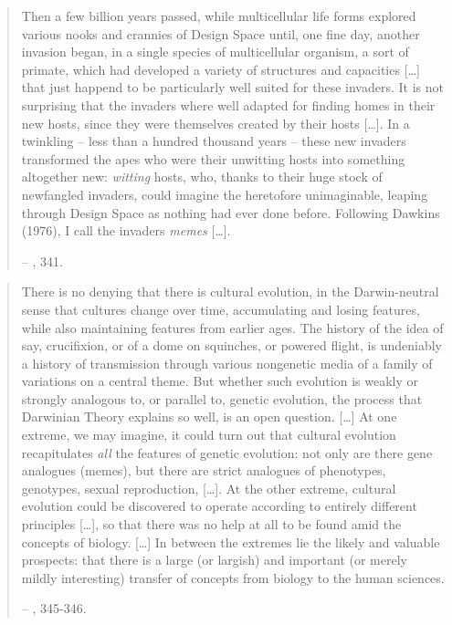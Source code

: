 \documentclass[openany,twoside,twocolumn]{book}
\begin{document}
\begin{quote}
Then a few billion years passed, while multicellular life forms explored
various nooks and crannies of Design Space until, one fine day, another
invasion began, in a single species of multicellular organism, a sort of
primate, which had developed a variety of structures and capacities
{[}\ldots{}{]} that just happend to be particularly well suited for
these invaders. It is not surprising that the invaders where well
adapted for finding homes in their new hosts, since they were themselves
created by their hosts {[}\ldots{}{]}. In a twinkling -- less than a
hundred thousand years -- these new invaders transformed the apes who
were their unwitting hosts into something altogether new: \emph{witting}
hosts, who, thanks to their huge stock of newfangled invaders, could
imagine the heretofore unimaginable, leaping through Design Space as
nothing had ever done before. Following Dawkins (1976), I call the
invaders \emph{memes} {[}\ldots{}{]}.

-- \textcite{dennett_darwins_1995}, 341.
\end{quote}

\begin{quote}
There is no denying that there is cultural evolution, in the
Darwin-neutral sense that cultures change over time, accumulating and
losing features, while also maintaining features from earlier ages. The
history of the idea of say, crucifixion, or of a dome on squinches, or
powered flight, is undeniably a history of transmission through various
nongenetic media of a family of variations on a central theme. But
whether such evolution is weakly or strongly analogous to, or parallel
to, genetic evolution, the process that Darwinian Theory explains so
well, is an open question. {[}\ldots{}{]} At one extreme, we may
imagine, it could turn out that cultural evolution recapitulates
\emph{all} the features of genetic evolution: not only are there gene
analogues (memes), but there are strict analogues of phenotypes,
genotypes, sexual reproduction, {[}\ldots{}{]}. At the other extreme,
cultural evolution could be discovered to operate according to entirely
different principles {[}\ldots{}{]}, so that there was no help at all to
be found amid the concepts of biology. {[}\ldots{}{]} In between the
extremes lie the likely and valuable prospects: that there is a large
(or largish) and important (or merely mildly interesting) transfer of
concepts from biology to the human sciences.

-- \textcite{dennett_darwins_1995}, 345-346.
\end{quote}
\end{document}
